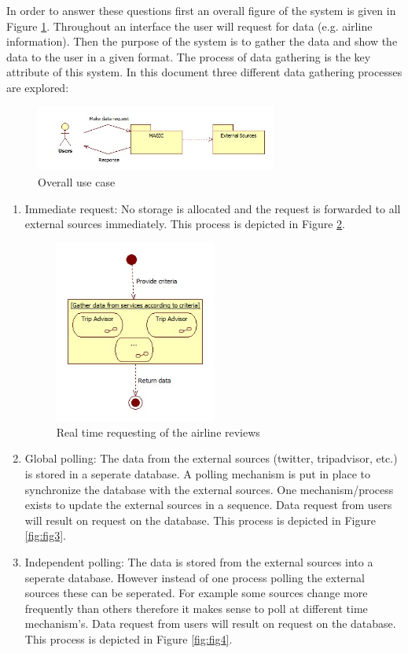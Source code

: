 \documentclass{article}
\begin{document}
In order to answer these questions first an overall figure of the system is given in Figure \ref{fig:fig1}. 
Throughout an interface the user will request for data (e.g. airline information). Then the purpose of the system is to gather
the data and show the data to the user in a given format. The process of data gathering is the key attribute of this system.
In this document three different data gathering processes are explored:

\begin{figure}[!]
\centering
\includegraphics[width=300px]{UserRequestingData}
\caption{Overall use case}
\label{fig:fig1}
\end{figure}

\begin{enumerate}
\item Immediate request: No storage is allocated and the request is forwarded to all external sources immediately. This process is depicted in Figure \ref{fig:fig2}.  

\begin{figure}[!htbp]
\centering
\includegraphics[width=200px]{Realtime}
\caption{Real time requesting of the airline reviews}
\label{fig:fig2}
\end{figure}

\item Global polling: The data from the external sources (twitter, tripadvisor, etc.) is stored in a seperate database. A polling mechanism is put in place to synchronize the database with the external sources. One mechanism/process exists to update the external sources in a sequence. Data request from users will result on request on the database. This process is depicted in Figure \ref{fig:fig3}.  
\item Independent polling: The data is stored from the external sources into a
seperate database. However instead of one process polling the external sources
these can be seperated. For example some sources change more frequently than
others therefore it makes sense to poll at different time mechanism's. Data
request from users will result on request on the database. This process is
depicted in Figure \ref{fig:fig4}.  
\end{enumerate}
\end{document}
